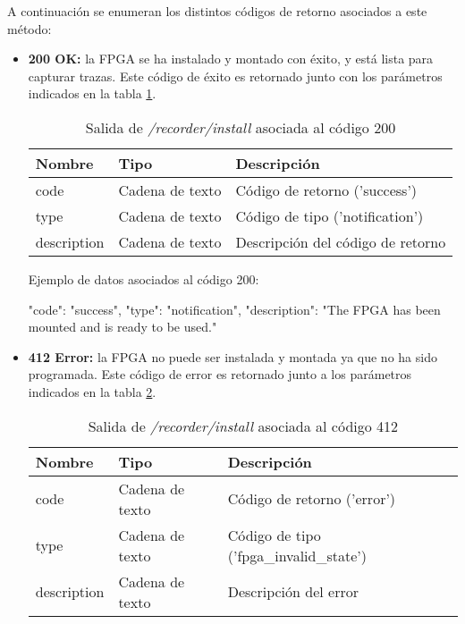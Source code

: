 A continuación se enumeran los distintos códigos de retorno asociados a este método:
\begin{itemize}

\item{\textbf{200 OK:} la \gls{FPGA} se ha instalado y montado con éxito, y está lista para capturar \glspl{traza}. Este código de éxito es retornado junto con los parámetros indicados en la tabla \ref{extra:api:recorderinstall:ok}.
\begin{table}[H]
\centering
\begin{tabular}{|l|l|l|}
\hline
\rowcolor[HTML]{F5F5F5}
\textbf{Nombre}  & \textbf{Tipo}   & \textbf{Descripción}              \\ \hline
code             & Cadena de texto & Código de retorno ('success')     \\ \hline
type             & Cadena de texto & Código de tipo ('notification')   \\ \hline
description      & Cadena de texto & Descripción del código de retorno \\ \hline
\end{tabular}
\caption{Salida de \textit{/recorder/install} asociada al código 200}
\label{extra:api:recorderinstall:ok}
\end{table}
\begin{minipage}{\textwidth}
Ejemplo de datos asociados al código 200:

\begin{code}[language=json]
{
  "code": "success",
  "type": "notification",
  "description": "The FPGA has been mounted and is ready to be used."
}
\end{code}
\end{minipage}
}

\item{\textbf{412 Error:} la \gls{FPGA} no puede ser instalada y montada ya que no ha sido programada. Este código de error es retornado junto a los parámetros indicados en la tabla \ref{extra:api:recorderinstall:error}.
\begin{table}[H]
\centering
\begin{tabular}{|l|l|l|}
\hline
\rowcolor[HTML]{F5F5F5}
\textbf{Nombre}  & \textbf{Tipo}   & \textbf{Descripción}                    \\ \hline
code             & Cadena de texto & Código de retorno ('error')             \\ \hline
type             & Cadena de texto & Código de tipo ('fpga\_invalid\_state') \\ \hline
description      & Cadena de texto & Descripción del error                   \\ \hline
\end{tabular}
\caption{Salida de \textit{/recorder/install} asociada al código 412}
\label{extra:api:recorderinstall:error}
\end{table}

}
\end{itemize}
